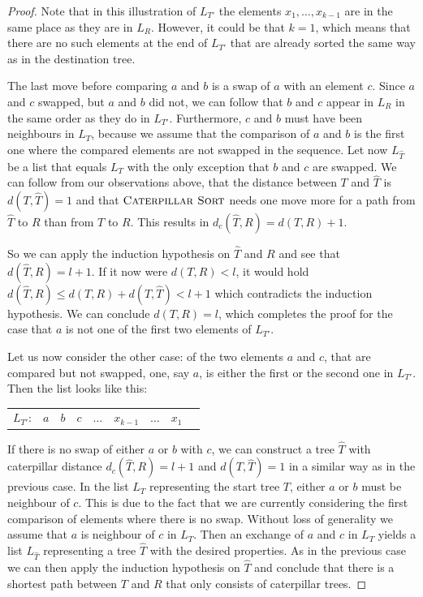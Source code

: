 \documentclass{amsart}
\newcommand{\csort}{\textsc{Caterpillar Sort}}
\begin{document}
\begin{proof}
    Note that in this illustration of $L_{T'}$ the elements $x_1, \ldots, x_{k-1}$ are in the same place as they are in $L_R$.
    However, it could be that $k=1$, which means that there are no such elements at the end of $L_{T'}$ that are already sorted the same way as in the destination tree.

    The last move before comparing $a$ and $b$ is a swap of $a$ with an element $c$.
    Since $a$ and $c$ swapped, but $a$ and $b$ did not, we can follow that $b$ and $c$ appear in $L_R$ in the same order as they do in $L_{T'}$.
    Furthermore, $c$ and $b$ must have been neighbours in $L_T$, because we assume that the comparison of $a$ and $b$ is the first one where the compared elements are not swapped in the sequence.
    Let now $L_{\hat T}$ be a list that equals $L_T$ with the only exception that $b$ and $c$ are swapped.
    We can follow from our observations above, that the distance between $T$ and $\hat T$ is $d(T, \hat T) = 1$ and that $\csort$ needs one move more for a path from $\hat T$ to $R$ than from $T$ to $R$.
    This results in $d_c(\hat T, R) = d(T,R) + 1$.

    So we can apply the induction hypothesis on $\hat T$ and $R$ and see that $d(\hat T,R) = l+1$.
    If it now were $d(T,R) < l$, it would hold $d(\hat T,R) \leq d(T,R) + d(T,\hat T) < l + 1$ which contradicts the induction hypothesis.
    We can conclude $d(T,R) = l$, which completes the proof for the case that $a$ is not one of the first two elements of $L_{T'}$.

    Let us now consider the other case:
    of the two elements $a$ and $c$, that are compared but not swapped, one, say $a$, is either the first or the second one in $L_{T'}$.
    Then the list looks like this:

    \vspace{12pt}
    \begin{tabular}{c|c|c|c|c|c|c|c|c|}
        \cline{2-8}
        $L_{T'}$: & $a$ & $b$ & $c$ & $\ldots$ & $x_{k-1}$ & $\ldots$ & $x_1$\\
        \cline{2-8}
    \end{tabular}
    \vspace{12pt}

    If there is no swap of either $a$ or $b$ with $c$, we can construct a tree $\hat T$ with caterpillar distance $d_c(\hat T, R) = l+1$ and $d(T,\hat T) = 1$ in a similar way as in the previous case.
    In the list $L_T$ representing the start tree $T$, either $a$ or $b$ must be neighbour of $c$.
    This is due to the fact that we are currently considering the first comparison of elements where there is no swap.
    Without loss of generality we assume that $a$ is neighbour of $c$ in $L_T$.
    Then an exchange of $a$ and $c$ in $L_T$ yields a list $L_{\hat T}$ representing a tree $\hat T$ with the desired properties.
    As in the previous case we can then apply the induction hypothesis on $\hat T$ and conclude that there is a shortest path between $T$ and $R$ that only consists of caterpillar trees.
\end{proof}
\end{document}
